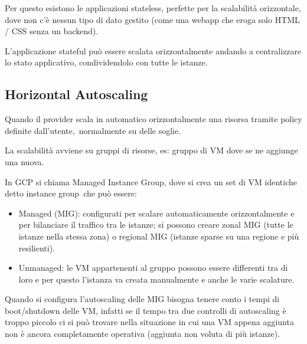 \documentclass[
]{article}
\providecommand{\tightlist}{%
  \setlength{\itemsep}{0pt}\setlength{\parskip}{0pt}}
\begin{document}
{Per questo esistono le applicazioni }{stateless}{, perfette per la
scalabilità orizzontale, dove non c'è nessun tipo di dato gestito (come
una webapp che eroga solo HTML / CSS senza un backend).}

{}

{L'applicazione stateful può essere scalata orizzontalmente andando a
centralizzare lo stato applicativo, condividendolo con tutte le
istanze.}

{}

\subsection{\texorpdfstring{{Horizontal
Autoscaling}}{Horizontal Autoscaling}}\label{h.2xd9muwm437}

{Quando il provider scala in automatico orizzontalmente una risorsa
tramite policy }{definite dall'utente,}{~normalmente su delle soglie.}

{La scalabilità avviene su gruppi di risorse, es: gruppo di VM dove se
ne aggiunge una nuova. }

{}

{In GCP si chiama Managed Instance Group}{, dove si crea un set di VM
identiche detto }{instance group}{~che può essere:}

\begin{itemize}
\tightlist
\item
  {Managed (MIG)}{: configurati per scalare automaticamente
  orizzontalmente e per bilanciare il traffico tra le istanze; si
  possono creare zonal MIG (tutte le istanze nella stessa zona) o
  regional MIG (istanze sparse su una regione e più resilienti).}
\end{itemize}

{}

\begin{itemize}
\tightlist
\item
  {Unmanaged}{: le VM appartenenti al gruppo possono essere differenti
  tra di loro e per questo l'istanza va creata manualmente e anche le
  varie scalature.}
\end{itemize}

{}

{Quando si configura l'autoscaling delle }{MIG }{bisogna tenere conto i
tempi di boot/shutdown delle VM, infatti se il tempo tra due controlli
di autoscaling è troppo piccolo ci si può trovare nella situazione in
cui una VM appena aggiunta non è ancora completamente operativa
(aggiunta non voluta di più istanze).}
\end{document}
